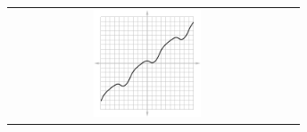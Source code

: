 \begin{questions}
\begin{center}
\begin{tabular}{cc}
        \includegraphics[width=0.4\textwidth]{anti6}
      \end{tabular}
    \end{center}
\end{questions}


